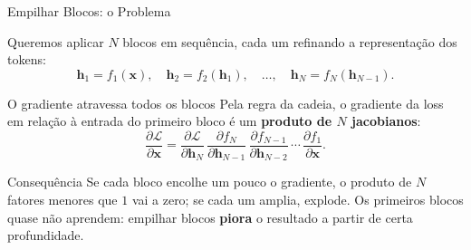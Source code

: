 \documentclass[aspectratio=169,xcolor=dvipsnames]{beamer}
\begin{document}
\begin{frame}{Empilhar Blocos: o Problema}

Queremos aplicar $N$ blocos em sequência, cada um refinando a representação dos tokens:
\[
\mathbf{h}_1 = f_1(\mathbf{x}), \quad \mathbf{h}_2 = f_2(\mathbf{h}_1), \quad \dots, \quad \mathbf{h}_N = f_N(\mathbf{h}_{N-1}).
\]

\begin{block}{O gradiente atravessa todos os blocos}
Pela regra da cadeia, o gradiente da loss em relação à entrada do primeiro bloco é um \textbf{produto de $N$ jacobianos}:
\[
\frac{\partial \mathcal{L}}{\partial \mathbf{x}}
= \frac{\partial \mathcal{L}}{\partial \mathbf{h}_N}\,
\frac{\partial f_N}{\partial \mathbf{h}_{N-1}}\,
\frac{\partial f_{N-1}}{\partial \mathbf{h}_{N-2}}\,
\cdots\,
\frac{\partial f_1}{\partial \mathbf{x}}.
\]
\end{block}

\vspace{2pt}

\begin{alertblock}{Consequência}
Se cada bloco encolhe um pouco o gradiente, o produto de $N$ fatores menores que $1$ vai a zero; se cada um amplia, explode. Os primeiros blocos quase não aprendem: empilhar blocos \textbf{piora} o resultado a partir de certa profundidade.
\end{alertblock}

\end{frame}

\end{document}
